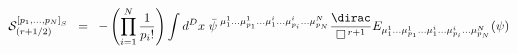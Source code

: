\begin{equation}
{\cal{S}}^{{[ p_1 ,..., p_N ]}_S}_{(r+ 1/2)} \;\; =\;\; - \left(
\prod_{i=1}^{N} \frac{1}{p_i !} \right) \int d^D x \; {\bar{\psi}}^{\;
{\mu}^1_1 ...{\mu}^1_{p_1} ...{\mu}^i_1 ...{\mu}^i_{p_i}
...{\mu}^N_{p_N} } {\dirac \over \square^{\, r+1}} E_{{\mu}^1_1
...{\mu}^1_{p_1} ...{\mu}^i_1 ...{\mu}^i_{p_i} ...{\mu}^N_{p_N}} ( \psi
)
\label{eq:3.8}
\end{equation}

